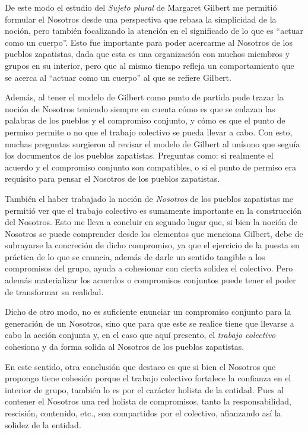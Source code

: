 \documentclass[oneside]{book}
\begin{document}
De este modo el estudio del \textit{Sujeto plural} de Margaret Gilbert me permitió formular el Nosotros desde una perspectiva que rebasa la simplicidad de la noción, pero también focalizando la atención en el significado de lo que es “actuar como un cuerpo”. Esto fue importante para poder acercarme al Nosotros de los pueblos zapatistas, dada que esta es una organización con muchos miembros y grupos en su interior, pero que al mismo tiempo refleja un comportamiento que se acerca al “actuar como un cuerpo” al que se refiere Gilbert.

Además, al tener el modelo de Gilbert como punto de partida pude trazar la noción de Nosotros teniendo siempre en cuenta cómo es que se enlazan las palabras de los pueblos y el compromiso conjunto, y cómo es que el punto de permiso permite o no que el trabajo colectivo se pueda llevar a cabo. Con esto, muchas preguntas surgieron al revisar el modelo de Gilbert al unísono que seguía los documentos de los pueblos zapatistas. Preguntas como: si realmente el acuerdo y el compromiso conjunto son compatibles, o si el punto de permiso era requisito para pensar el Nosotros de los pueblos zapatistas.

También el haber trabajado la noción de \textit{Nosotros} de los pueblos zapatistas me permitió ver que el trabajo colectivo es sumamente importante en la construcción del Nosotros. Esto me lleva a concluir en segundo lugar que, si bien la noción de Nosotros se puede comprender desde los elementos que menciona Gilbert, debe de subrayarse la concreción de dicho compromiso, ya que el ejercicio de la puesta en práctica de lo que se enuncia, además de darle un sentido tangible a los compromisos del grupo, ayuda a cohesionar con cierta solidez el colectivo. Pero además materializar los acuerdos o compromisos conjuntos puede tener el poder de transformar su realidad.

Dicho de otro modo, no es suficiente enunciar un compromiso conjunto para la generación de un Nosotros, sino que para que este se realice tiene que llevarse a cabo la acción conjunta y, en el caso que aquí presento, el \textit{trabajo colectivo} cohesiona y da forma solida al Nosotros de los pueblos zapatistas.

En este sentido, otra conclusión que destaco es que si bien el Nosotros que propongo tiene cohesión porque el trabajo colectivo fortalece la confianza en el interior de grupo, también lo es por el carácter holista de la entidad. Pues al contener el Nosotros una red holista de compromisos, tanto la responsabilidad, rescisión, contenido, etc., son compartidos por el colectivo, afianzando así la solidez de la entidad.
\end{document}
